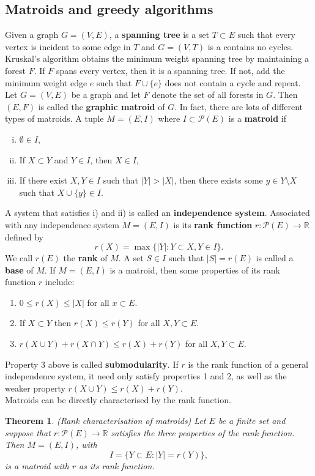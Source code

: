 \documentclass[12pt]{article}
\newcommand{\R}{\mathbb{R}}
\theoremstyle{plain}
\newtheorem*{theorem*}{Theorem}
\begin{document}
\subsection{Matroids and greedy algorithms}
Given a graph $G=(V,E)$, a \textbf{spanning tree} is a set $T\subset E$ such that every vertex is incident to some edge in $T$ and $G=(V,T)$ is a contains no cycles. Kruskal's algorithm obtains the minimum weight spanning tree by maintaining a forest $F$. If $F$ spans every vertex, then it is a spanning tree. If not, add the minimum weight edge $e$ such that $F\cup \{e\}$ does not contain a cycle and repeat.\\
\indent Let $G=(V,E)$ be a graph and let $F$ denote the set of all forests in $G$. Then $(E,F)$ is called the \textbf{graphic matroid} of $G$. In fact, there are lots of different types of matroids. A tuple $M=(E,I)$ where $I\subset \mathcal{P}(E)$ is a \textbf{matroid} if
\begin{enumerate}[i)]
    \item $\emptyset\in I$,
    \item If $X\subset Y$ and $Y\in I$, then $X\in I$,
    \item If there exist $X,Y \in I$ such that $|Y| > |X|$, then there exists some $y\in Y\setminus X$ such that $X\cup\{y\}\in I$.
\end{enumerate}
A system that satisfies i) and ii) is called an \textbf{independence system}. Associated with any independence system $M = (E,I)$ is its \textbf{rank function} $r : \mathcal{P}(E)\rightarrow \R$ defined by
$$r(X) = \max\{ |Y| : Y \subset X, Y\in I\}.$$
We call $r(E)$ the \textbf{rank} of $M$. A set $S\in I$ such that $|S| = r(E)$ is called a \textbf{base} of $M$. If $M=(E,I)$ is a matroid, then some properties of its rank function $r$ include:
\begin{enumerate}
    \item $0\leq r(X) \leq |X|$ for all $x\subset E$.
    \item If $X\subset Y$ then $r(X)\leq r(Y)$ for all $X, Y\subset E$.
    \item $r(X\cup Y)+r(X\cap Y) \leq r(X) + r(Y)$ for all $X,Y\subset E$.
\end{enumerate}
Property 3 above is called \textbf{submodularity}. If $r$ is the rank function of a general independence system, it need only satisfy properties 1 and 2, as well as the weaker property $r(X\cup Y) \leq r(X) + r(Y)$.\\
\indent Matroids can be directly characterised by the rank function.
\begin{theorem*}{\textup{(Rank characterisation of matroids)}}
    Let $E$ be a finite set and suppose that $r : \mathcal{P}(E)\rightarrow \R$ satisfies the three peoperties of the rank function. Then $M=(E,I)$, with
    $$I = \{Y \subset E : |Y| = r(Y)\},$$
    is a matroid with $r$ as its rank function.
\end{theorem*}
\end{document}
